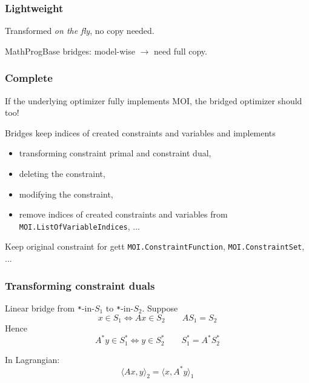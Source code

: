 \documentclass{beamer}
\makeatletter
\newcommand{\JuMP}
{
J%
{%
  \sbox \z@ T%
  \vbox to\ht \z@ {%
    \hbox {%
      \check@mathfonts%
      \math@fontsfalse%
      \selectfont%
      u%
    }%
    \vss%
  }%
}%
MP
}
\makeatother
\begin{document}
\begin{frame}
  \frametitle{Lightweight}
  Transformed \emph{on the fly}, \alert{no copy} needed.

  MathProgBase bridges: model-wise $\to$ need full \alert{copy}.

  \begin{center}
  \end{center}

\end{frame}

\begin{frame}
  \frametitle{Complete}
  If the underlying optimizer fully implements MOI,
  the bridged optimizer should too!

  Bridges keep indices of created constraints and variables
  and implements
  \begin{itemize}
      \item transforming constraint primal and constraint dual,
      \item deleting the constraint,
      \item modifying the constraint,
      \item remove indices of created constraints and variables from
        \texttt{MOI.ListOfVariableIndices}, ...
  \end{itemize}
  Keep original constraint for gett \texttt{MOI.ConstraintFunction},
  \texttt{MOI.ConstraintSet}, ...
\end{frame}

\begin{frame}%
  \frametitle{Transforming constraint duals}
  \begin{block}{Linear bridge from \texttt{*}-in-$S_1$ to \texttt{*}-in-$S_2$.}
  Suppose
  \[ x \in S_1 \Leftrightarrow Ax \in S_2 \qquad AS_1 = S_2 \]
  Hence
  \[ A^* y \in S_1^* \Leftrightarrow y \in S_2^* \qquad S_1^* = A^* S_2^* \]

  In Lagrangian:
  \[ \langle Ax, y \rangle_2 = \langle x, A^* y \rangle_1 \]
  \end{block}
\end{frame}
\end{document}
